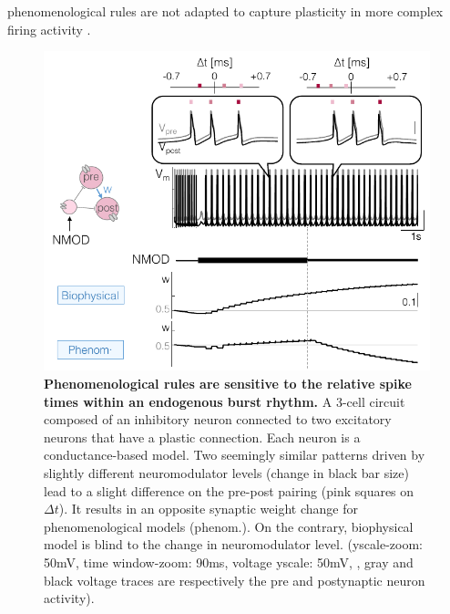 phenomenological rules are not adapted to capture plasticity in more complex firing activity \citep{gjorgjieva_burst-time-dependent_2009, jacquerie_switches_2022}.



\begin{figure}[H]
    \centering
\includegraphics[scale=1]{fig/Review/fig_part3_synchr.pdf}
    \caption{\textbf{Phenomenological rules are sensitive to the relative spike times within an endogenous burst rhythm.} A 3-cell circuit composed of an inhibitory neuron connected to two excitatory neurons that have a plastic connection. Each neuron is a conductance-based model.
    Two seemingly similar patterns driven by slightly different neuromodulator levels (change in black bar size) lead to a slight difference on the pre-post pairing (pink squares on $\Delta t$). It results in an opposite synaptic weight change for phenomenological models (phenom.). On the contrary, biophysical model is blind to the change in neuromodulator level. (yscale-zoom: 50mV, time window-zoom: 90ms, voltage yscale: 50mV, , gray and black voltage traces are respectively the pre and postynaptic neuron activity).}
    \label{fig:synchr}
\end{figure}

